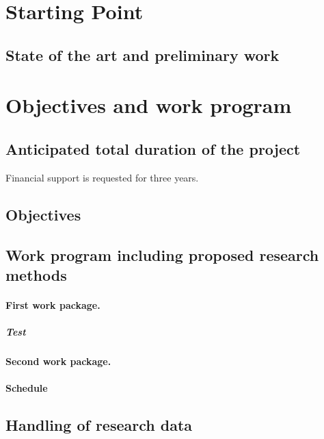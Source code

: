 \documentclass{scrartcl}
\begin{document}
\makeprojecttitle


\section{Starting Point}
\label{sec:work-report}

\subsection*{State of the art and preliminary work}

\section{Objectives and work program}

\subsection{Anticipated total duration of the project}
Financial support is requested for three years.

\subsection{Objectives}

\subsection{Work program including proposed research methods}

\workpackagestyle
\hrulefill
\paragraph{First work package.}
\label{wp:1}
\subparagraph{Test}
\hrulefill
\paragraph{Second work package.}
\label{wp:2}

\standardstyle
\paragraph*{Schedule}

\subsection{Handling of research data}
\end{document}
